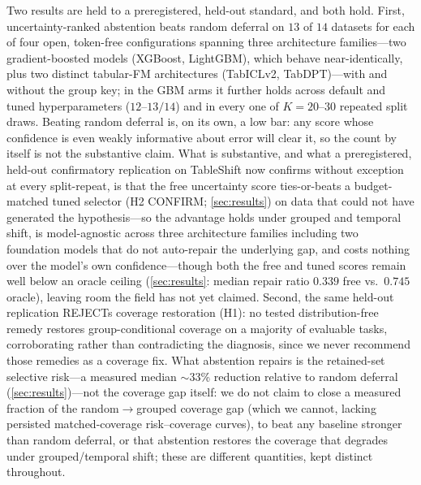 \documentclass[pdflatex,sn-mathphys-num]{sn-jnl}
\begin{document}
Two results are held to a preregistered, held-out standard, and both hold. First,
uncertainty-ranked abstention beats random deferral on $13$ of $14$ datasets for each of four open,
token-free configurations spanning three architecture families---two gradient-boosted models (XGBoost,
LightGBM), which behave near-identically, plus two distinct tabular-FM
architectures (TabICLv2, TabDPT)---with and without the group key; in the GBM arms it further holds across
default and tuned hyperparameters ($12$--$13/14$) and in every one of $K{=}20$--$30$ repeated split draws.
Beating random deferral is, on its own, a low bar: any score whose confidence is even weakly informative
about error will clear it, so the count by itself is not the substantive claim. What is substantive, and
what a preregistered, held-out confirmatory replication on TableShift now confirms without exception at
every split-repeat, is that the free uncertainty score ties-or-beats a budget-matched tuned selector (H2
CONFIRM; \cref{sec:results}) on data that could not have generated the hypothesis---so the advantage holds
under grouped and temporal shift, is model-agnostic across three architecture families including two
foundation models that do not auto-repair the underlying gap, and costs nothing over the model's own
confidence---though both the free and tuned scores remain well below an oracle ceiling (\cref{sec:results}:
median repair ratio $0.339$ free vs.\ $0.745$ oracle), leaving room the field has not yet claimed. Second,
the same held-out replication REJECTs coverage restoration (H1): no tested distribution-free remedy
restores group-conditional coverage on a majority of evaluable tasks, corroborating rather than
contradicting the diagnosis, since we never recommend those remedies as a coverage fix. What abstention
repairs is the retained-set selective risk---a measured median $\sim$33\% reduction relative to
random deferral (\cref{sec:results})---not the coverage gap itself: we do not claim to close a measured
fraction of the random$\to$grouped coverage gap (which we cannot, lacking persisted matched-coverage
risk--coverage curves), to beat any baseline stronger than random deferral, or that abstention restores the
coverage that degrades under grouped/temporal shift; these are different quantities, kept distinct
throughout.
\end{document}

